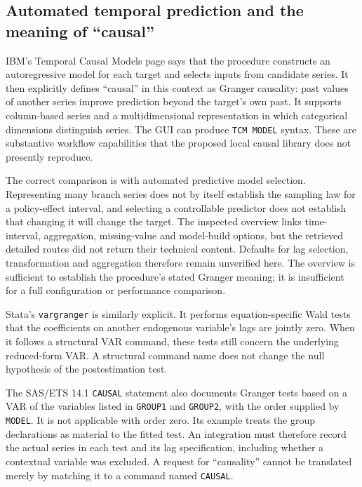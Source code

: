 \hypertarget{automated-temporal-prediction-and-the-meaning-of-causal}{%
\subsection{Automated temporal prediction and the meaning of
``causal''}\label{automated-temporal-prediction-and-the-meaning-of-causal}}

IBM's Temporal Causal Models page says that the procedure constructs an
autoregressive model for each target and selects inputs from candidate
series. It then explicitly defines ``causal'' in this context as Granger
causality: past values of another series improve prediction beyond the
target's own past. It supports column-based series and a
multidimensional representation in which categorical dimensions
distinguish series. The GUI can produce \texttt{TCM\ MODEL} syntax.
These are substantive workflow capabilities that the proposed local
causal library does not presently reproduce. \citep{exec13_ct_ibm_tcm}

The correct comparison is with automated predictive model selection.
Representing many branch series does not by itself establish the
sampling law for a policy-effect interval, and selecting a controllable
predictor does not establish that changing it will change the target.
The inspected overview links time-interval, aggregation, missing-value
and model-build options, but the retrieved detailed routes did not
return their technical content. Defaults for lag selection,
transformation and aggregation therefore remain unverified here. The
overview is sufficient to establish the procedure's stated Granger
meaning; it is insufficient for a full configuration or performance
comparison.

Stata's \texttt{vargranger} is similarly explicit. It performs
equation-specific Wald tests that the coefficients on another endogenous
variable's lags are jointly zero. When it follows a structural VAR
command, these tests still concern the underlying reduced-form VAR. A
structural command name does not change the null hypothesis of the
postestimation test. \citep{exec13_ct_stata_granger}

The SAS/ETS 14.1 \texttt{CAUSAL} statement also documents Granger tests
based on a VAR of the variables listed in \texttt{GROUP1} and
\texttt{GROUP2}, with the order supplied by \texttt{MODEL}. It is not
applicable with order zero. Its example treats the group declarations as
material to the fitted test. An integration must therefore record the
actual series in each test and its lag specification, including whether
a contextual variable was excluded. A request for ``causality'' cannot
be translated merely by matching it to a command named
\texttt{CAUSAL}.~\citep{exec13_ct_sas_causal}

